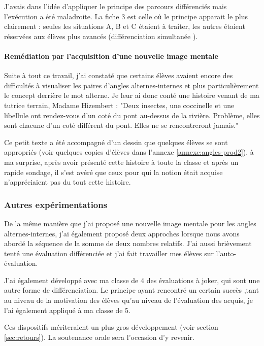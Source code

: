 J'avais dans l'idée d'appliquer le principe des parcours différenciés mais l'exécution a été maladroite. La fiche 3 est celle où le principe apparait le plus clairement : seules les situations A, B et C étaient à traiter, les autres étaient réservées aux élèves plus avancés (différenciation simultanée \cite{Eduscol}).

\paragraph{Remédiation par l'acquisition d'une nouvelle image mentale}

Suite à tout ce travail, j'ai constaté que certains élèves avaient encore des difficultés à visualiser les paires d'angles alternes-internes et plus particulièrement le concept derrière le mot alterne. Je leur ai donc conté une histoire venant de ma tutrice terrain, Madame Hizembert : "Deux insectes, une coccinelle et une libellule ont rendez-vous d'un coté du pont au-dessus de la rivière. Problème, elles sont chacune d'un coté différent du pont. Elles ne se rencontreront jamais."

Ce petit texte a été accompagné d'un dessin que quelques élèves se sont appropriés (voir quelques copies d'élèves dans l'annexe \ref{annexe:angles-prod2}). à ma surprise, après avoir présenté cette histoire à toute la classe et après un rapide sondage, il s'est avéré que ceux pour qui la notion était acquise n'appréciaient pas du tout cette histoire.

\subsubsection{Autres expérimentations}

De la même manière que j'ai proposé une nouvelle image mentale pour les angles alternes-internes, j'ai également proposé deux approches lorsque nous avons abordé la séquence de la somme de deux nombres relatifs. J'ai aussi brièvement tenté une évaluation différenciée et j'ai fait travailler mes élèves sur l'auto-évaluation.

J'ai également développé avec ma classe de 4 des évaluations à joker, qui sont une autre forme de différenciation. Le principe ayant rencontré un certain succès ,tant au niveau de la motivation des élèves qu'au niveau de l'évaluation des acquis, je l'ai également appliqué à ma classe de 5.

Ces dispositifs mériteraient un plus gros développement (voir section \ref{sec:retours}). La soutenance orale sera l'occasion d'y revenir.

